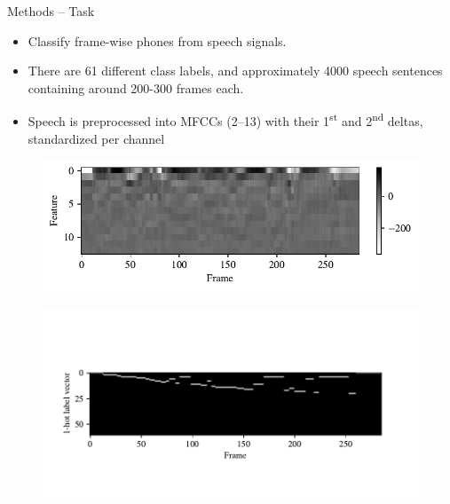 \documentclass[t]{beamer}
\begin{document}


\begin{frame}{Methods -- Task}
  \begin{itemize}[label=--]
    \item Classify frame-wise phones from speech signals.
    \item There are 61 different class labels, and approximately 4000 speech sentences containing around 200-300 frames each.
    \item Speech is preprocessed into MFCCs (2--13) with their 1\textsuperscript{st} and 2\textsuperscript{nd} deltas, standardized per channel
  \end{itemize}
  \begin{figure}[!ht]
    \centering
    \includegraphics[width=\linewidth]{norm_mfcc}
  \end{figure}
  \begin{figure}[!ht]
    \centering
    \includegraphics[width=\linewidth]{target}
  \end{figure}
\end{frame}
\end{document}
